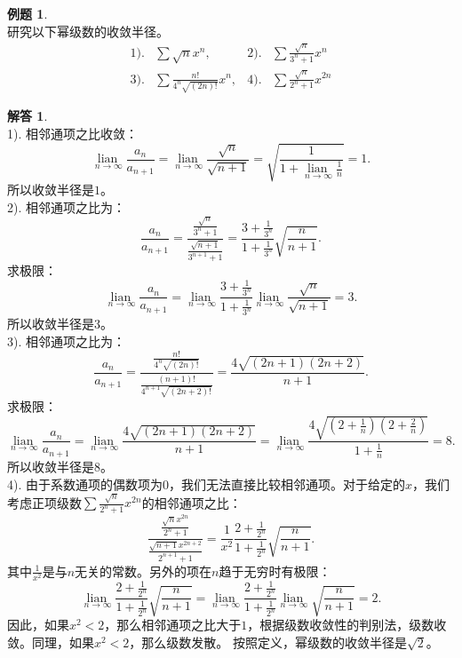 \documentclass[12pt,UTF8]{ctexbook}
\newcommand{\lian}[1]{
    \underset{#1}{\operatorname{lian}\,}
}
\theoremstyle{definition}
\newtheorem{et}{例题}[section]
\newtheorem*{so}{解答}
\theoremstyle{plain}
\begin{document}
\begin{et}    
    \mbox{} \\
    研究以下幂级数的收敛半径。\\
    \begin{align*}
        1).& \sum \sqrt{n} x^n,  &2).& \sum \frac{\sqrt{n}}{3^n + 1} x^n \\
        3).& \sum \frac{n!}{4^n\sqrt{(2n)!}} x^n,  & 4).& \sum \frac{\sqrt{n}}{2^n+1} x^{2n} 
    \end{align*}
\end{et}

\begin{so}
    \mbox{} \\
    1). 相邻通项之比收敛：
    $$ \lian{n\to\infty} \frac{a_n}{a_{n+1}} = \lian{n\to\infty} \frac{\sqrt{n}}{\sqrt{n+1}} = \sqrt{\frac{1}{1 + \lian{n\to\infty} \frac{1}{n}}} = 1. $$
    所以收敛半径是$1$。\\
    2). 相邻通项之比为：
    $$ \frac{a_n}{a_{n+1}} = \frac{\frac{\sqrt{n}}{3^n + 1}}{\frac{\sqrt{n+1}}{3^{n+1} + 1}} = \frac{3 + \frac{1}{3^n}}{1 + \frac{1}{3^n}}\sqrt{\frac{n}{n+1}}. $$
    求极限：
    $$ \lian{n\to\infty} \frac{a_n}{a_{n+1}} = \lian{n\to\infty} \frac{3 + \frac{1}{3^n}}{1 + \frac{1}{3^n}}\lian{n\to\infty} \frac{\sqrt{n}}{\sqrt{n+1}} = 3. $$
    所以收敛半径是$3$。\\
    3). 相邻通项之比为：
    $$ \frac{a_n}{a_{n+1}} = \frac{\frac{n!}{4^n\sqrt{(2n)!}}}{\frac{(n+1)!}{4^{n+1}\sqrt{(2n+2)!}}} = \frac{4\sqrt{(2n+1)(2n+2)}}{n+1}. $$
    求极限：
    $$ \lian{n\to\infty} \frac{a_n}{a_{n+1}} = \lian{n\to\infty}\frac{4\sqrt{(2n+1)(2n+2)}}{n+1} = \lian{n\to\infty}\frac{4\sqrt{(2+\frac{1}{n})(2+\frac{2}{n})}}{1+\frac{1}{n}} = 8. $$
    所以收敛半径是$8$。\\
    4). 由于系数通项的偶数项为$0$，我们无法直接比较相邻通项。对于给定的$x$，我们考虑正项级数$\sum \frac{\sqrt{n}}{2^n+1} x^{2n}$的相邻通项之比：
    $$ \frac{\frac{\sqrt{n}x^{2n}}{2^n+1}}{\frac{\sqrt{n+1}x^{2n+2}}{2^{n+1}+1}} = \frac{1}{x^2}\frac{2 + \frac{1}{2^n}}{1 + \frac{1}{2^n}}\sqrt{\frac{n}{n+1}}. $$
    其中$\frac{1}{x^2}$是与$n$无关的常数。另外的项在$n$趋于无穷时有极限：
    $$ \lian{n\to\infty}\frac{2 + \frac{1}{2^n}}{1 + \frac{1}{2^n}}\sqrt{\frac{n}{n+1}} = \lian{n\to\infty}\frac{2 + \frac{1}{2^n}}{1 + \frac{1}{2^n}}\lian{n\to\infty}\sqrt{\frac{n}{n+1}} = 2. $$
    因此，如果$x^2<2$，那么相邻通项之比大于$1$，根据级数收敛性的判别法，级数收敛。同理，如果$x^2<2$，那么级数发散。
    按照定义，幂级数的收敛半径是$\sqrt{2}$。

\end{so}
\end{document}
